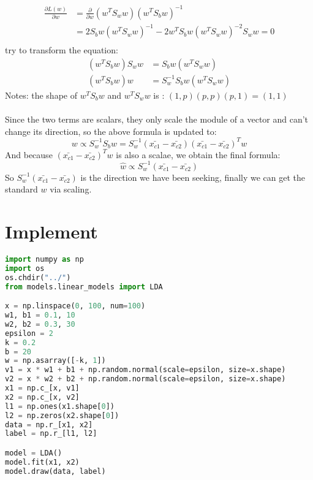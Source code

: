 \documentclass{report}
\begin{document}
\begin{equation}
\begin{aligned}
\frac{\partial{L(w)}}{\partial{w}}
&=\frac{\partial}{\partial{w}}(w^T S_w w)(w^T S_b w)^{-1}\\
&=2S_{b} w\left(w^{T} S_{w} w\right)^{-1}-2 w^{T} S_{b} w\left(w^{T} S_{w} w\right)^{-2} S_{w} w=0\\
\end{aligned} \end{equation}
try to transform the equation:
$$
\begin{aligned}
\left(w^{T} S_{b} w\right) S_{w} w&=S_{b} w\left(w^{T} S_{w} w\right)\\
\left(w^{T} S_{b} w\right) w&=S_{w}^{-1}S_{b} w\left(w^{T} S_{w} w\right)
\end{aligned}
$$
Notes: the shape of $w^T S_b w$ and $w^T S_w w$ is : $(1,p)(p,p) (p,1)=(1,1)$\\\\
Since the two terms are scalars, they only scale the module of a vector and can't change its direction, so the above formula is updated to:
$$
w \propto S_{w}^{-1} S_{b} w=S_{w}^{-1}\left(\bar{x_{c 1}}-\bar{x_{c 2}}\right)\left(\bar{x_{c 1}}-\bar{x_{c 2}}\right)^{T} w 
$$
And because $\left(\bar{x_{c 1}}-\bar{x_{c 2}}\right)^{T} w$ is also a scalae, we obtain the final formula:
$$
\hat{w}\propto S_{w}^{-1}\left(\bar{x_{c 1}}-\bar{x_{c 2}}\right)
$$
So $S_{w}^{-1}\left(\bar{x_{c 1}}-\bar{x_{c 2}}\right)$ is the direction we have been seeking, finally we can get the standard $w$ via scaling.
\section{Implement}
\begin{lstlisting}[language={python}]
import numpy as np
import os
os.chdir("../")
from models.linear_models import LDA

x = np.linspace(0, 100, num=100)
w1, b1 = 0.1, 10
w2, b2 = 0.3, 30
epsilon = 2
k = 0.2
b = 20
w = np.asarray([-k, 1])
v1 = x * w1 + b1 + np.random.normal(scale=epsilon, size=x.shape)
v2 = x * w2 + b2 + np.random.normal(scale=epsilon, size=x.shape)
x1 = np.c_[x, v1]
x2 = np.c_[x, v2]
l1 = np.ones(x1.shape[0])
l2 = np.zeros(x2.shape[0])
data = np.r_[x1, x2]
label = np.r_[l1, l2]

model = LDA()
model.fit(x1, x2)
model.draw(data, label)
\end{lstlisting}
\end{document}
